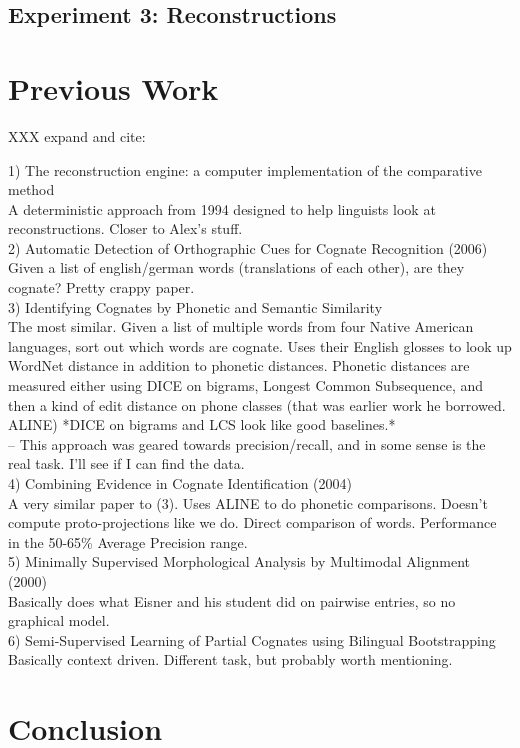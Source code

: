 \documentclass[11pt,a4paper]{article}
\begin{document}
\subsection{Experiment 3: Reconstructions}


\section{Previous Work}
XXX expand and cite:

1) The reconstruction engine: a computer implementation of the
comparative method\\
  A deterministic approach from 1994 designed to help linguists look
at reconstructions. Closer to Alex's stuff. \\
2) Automatic Detection of Orthographic Cues for Cognate Recognition (2006) \\
  Given a list of english/german words (translations of each other),
are they cognate? Pretty crappy paper.\\
3) Identifying Cognates by Phonetic and Semantic Similarity \\
  The most similar. Given a list of multiple words from four Native
American languages, sort out which words are cognate. Uses their
English glosses to look up WordNet distance in addition to phonetic
distances. Phonetic distances are measured either using DICE on
bigrams, Longest Common Subsequence, and then a kind of edit distance
on phone classes (that was earlier work he borrowed. ALINE) *DICE on
bigrams and LCS look like good baselines.*\\
  -- This approach was geared towards precision/recall, and in some
sense is the real task. I'll see if I can find the data. \\
4)  Combining Evidence in Cognate Identification (2004) \\
  A very similar paper to (3). Uses ALINE to do phonetic comparisons.
Doesn't compute proto-projections like we do. Direct comparison of
words. Performance in the 50-65\% Average Precision range.\\
5) Minimally Supervised Morphological Analysis by Multimodal Alignment (2000) \\
  Basically does what Eisner and his student did on pairwise entries,
so no graphical model.\\
6) Semi-Supervised Learning of Partial Cognates using Bilingual Bootstrapping
  Basically context driven. Different task, but probably worth mentioning.

\section{Conclusion}
\end{document}

